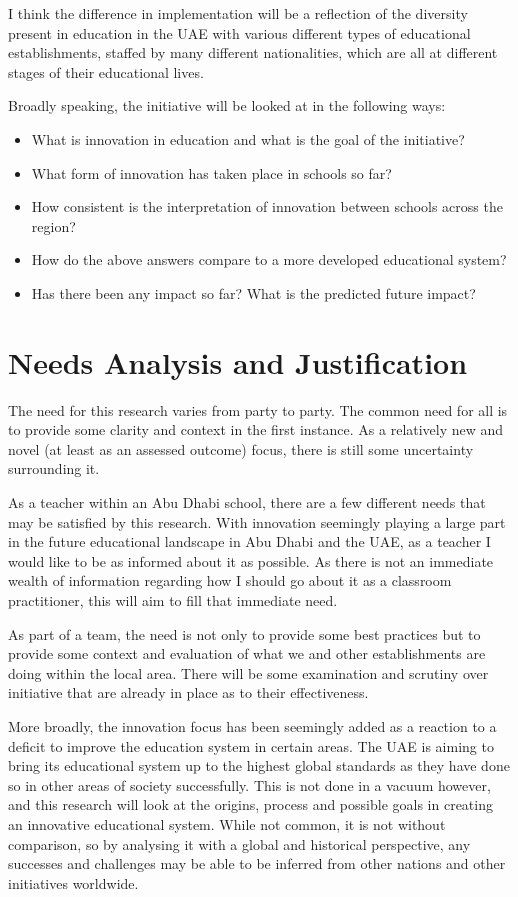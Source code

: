 I think the difference in implementation will be a reflection of the diversity present in education in the UAE with various different types of educational establishments, staffed by many different nationalities, which are all at different stages of their educational lives.

Broadly speaking, the initiative will be looked at in the following ways: 

\begin{itemize}
\item What is innovation in education and what is the goal of the initiative?
\item What form of innovation has taken place in schools so far?
\item How consistent is the interpretation of innovation between schools across the region?
\item How do the above answers compare to a more developed educational system?
\item Has there been any impact so far? What is the predicted future impact?
\end{itemize}

\section{Needs Analysis and Justification}

The need for this research varies from party to party. The common need for  all is to provide some clarity and context in the first instance. As a relatively new and novel (at least as an assessed outcome) focus, there is still some uncertainty surrounding it.

As a teacher within an Abu Dhabi school, there are a few different needs that may be satisfied by this research. With innovation seemingly playing a large part in the future educational landscape in Abu Dhabi and the UAE, as a teacher I would like to be as informed about it as possible. As there is not an immediate wealth of information regarding how I should go about it as a classroom practitioner, this will aim to fill that immediate need.

As part of a team, the need is not only to provide some best practices but to provide some context and evaluation of what we and other establishments are doing within the local area. There will be some examination and scrutiny over initiative that are already in place as to their effectiveness.

More broadly, the innovation focus has been seemingly added as a reaction to a deficit to improve the education system in certain areas. The UAE is aiming to bring its educational system up to the highest global standards as they have done so in other areas of society successfully. This is not done in a vacuum however, and this research will look at the origins, process and possible goals in creating an innovative educational system. While not common, it is not without comparison, so by analysing it with a global and historical perspective, any successes and challenges may be able to be inferred from other nations and other initiatives worldwide.


